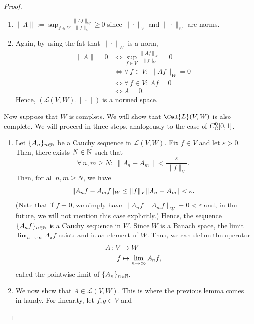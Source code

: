 \begin{proof}
\begin{enumerate}[label=(\alph*)]
  Hence, $zA$ is bounded.  and we have
  \begin{equation*}
  \|zA\|=|z|\|A\|.
  \end{equation*}
  \item
    $\displaystyle \|A\|:=\sup_{f\in
    V}\frac{\|Af\|_W}{\|f\|_V}\geq 0$ since $\|\cdot\|_V$ and
    $\|\cdot\|_W$ are norms.
  \item Again, by using the fat that $\|\cdot\|_W$ is a norm,
  \begin{align*}
  \|A\|=0
  & \iff \sup_{f\in V}\frac{\|Af\|_W}{\|f\|_V}= 0 \\
  & \iff \forall \, f\in V:\ \|Af\|_W=0\\
  & \iff \forall \, f\in V:\ Af=0\\
  & \iff A=0.
  \end{align*}
Hence, $(\mathcal{L}(V,W),\|\cdot\|)$ is a normed space.
\end{enumerate}
Now suppose that \(W\) is complete.
We will show that $\Cal{L}(V,W)$ is also complete.
We will proceed in three steps, analogously to the case of $C_{\mathbb{C}}^0[0,1]$.
\begin{enumerate}[label=(c.\roman*)]
\item Let $\{A_n\}_{n\in \mathbb{N}}$ be a Cauchy sequence in
  $\mathcal{L}(V,W)$. Fix $f\in V$ and let $\varepsilon >0$. Then,
  there exists $N\in \mathbb{N}$ such that
  \begin{equation*}
  \forall \, n,m\geq N : \ \|A_n-A_m\|<\frac{\varepsilon}{\|f\|_V}.
  \end{equation*}
  Then, for all $n,m\geq N$, we have
  \begin{equation*}
  \|A_nf-A_mf\|_W
  \leq \|f\|_V\|A_n-A_m\|\\
  < \varepsilon.
  \end{equation*}
  (Note that if $f=0$, we simply have $\|A_nf-A_mf\|_W=0<\varepsilon$
  and, in the future, we will not mention this case explicitly.) Hence,
  the sequence $\{A_nf\}_{n\in \mathbb{N}}$ is a Cauchy sequence in $W$. Since
  $W$ is a Banach space, the limit $\lim_{n\to \infty}A_nf$ exists and
  is an element of $W$. Thus, we can define the operator
  \begin{align*}
  A\colon V & \to W\\
  f & \mapsto \lim_{n\to \infty}A_nf,
  \end{align*}
  called the pointwise limit of $\{A_n\}_{n\in \mathbb{N}}$.
\item We now show that $A\in \mathcal{L}(V,W)$. This is where
  the previous lemma comes in handy. For linearity, let $f,g\in V$ and

\end{enumerate}
\end{proof}
